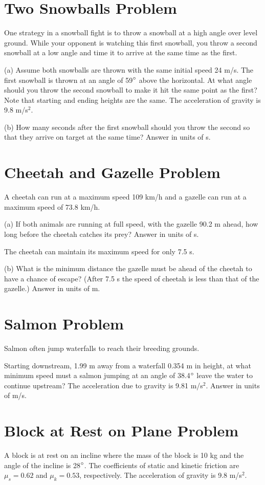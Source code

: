 \documentclass[../physics12.tex]{subfiles}
\begin{document}
\section{Two Snowballs Problem}
One strategy in a snowball fight is to throw a snowball at a high angle over level ground. While your opponent is watching this first snowball, you throw a second snowball at a low angle and time it to arrive at the same time as the first.

(a) Assume both snowballs are thrown with the same initial speed 24 m/s. The first snowball is thrown at an angle of 59$\degree$ above the horizontal. At what angle should you throw the second snowball to make it hit the same point as the first? 
Note that starting and ending heights are the same. The acceleration of gravity is 9.8 m/s$^2$.

(b) How many seconds after the first snowball should you throw the second so that they arrive on target at the same time?
Answer in units of s.

\section{Cheetah and Gazelle Problem}
A cheetah can run at a maximum speed 109 km/h and a gazelle can run at a maximum speed of 73.8 km/h.

(a) If both animals are running at full speed, with the gazelle 90.2 m ahead, how long before the cheetah catches its prey?
Answer in units of s.

The cheetah can maintain its maximum speed for only 7.5 s.

(b) What is the minimum distance the gazelle must be ahead of the cheetah to have a chance of escape? (After 7.5 s the speed of cheetah is less than that of the gazelle.)
Answer in units of m.

\section{Salmon Problem}
Salmon often jump waterfalls to reach their breeding grounds.

Starting downstream, 1.99 m away from a waterfall 0.354 m in height, at what minimum speed must a salmon jumping at an angle of 38.4$\degree$ leave the water to continue upstream?
The acceleration due to gravity is 9.81 m/s$^2$.
Answer in units of m/s.

\section{Block at Rest on Plane Problem}
A block is at rest on an incline where the mass of the block is 10 kg and the angle of the incline is 28$\degree$. The coefficients of static and kinetic friction are $\mu_s = 0.62$ and $\mu_k = 0.53$, respectively.
The acceleration of gravity is 9.8 m/s$^2$.
\end{document}
